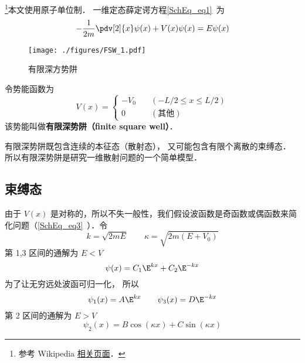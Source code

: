 
\begin{issues}
\issueTODO
\end{issues}





\footnote{参考 Wikipedia \href{https://en.wikipedia.org/wiki/Finite_potential_well}{相关页面}．}本文使用原子单位制． 一维定态薛定谔方程\autoref{SchEq_eq1}~为
\begin{equation}
-\frac{1}{2m}\pdv[2]{x}\psi(x) + V(x) \psi(x) = E \psi(x)
\end{equation}

\begin{figure}[ht]
\centering
\texttt{[image: ./figures/FSW\_1.pdf]}
\caption{有限深方势阱} \label{FSW_fig1}
\end{figure}
令势能函数为
\begin{equation}
V(x) = \begin{cases}
-V_0 \quad &(-L/2 \leqslant x \leqslant L/2)\\
0 \quad &(\text{其他})
\end{cases}
\end{equation}
该势能叫做\textbf{有限深势阱（finite square well）}．

有限深势阱既包含连续的本征态（散射态）， 又可能包含有限个离散的束缚态． %
所以有限深势阱是研究一维散射问题的一个简单模型．

\subsection{束缚态}
由于 $V(x)$ 是对称的，所以不失一般性，我们假设波函数是奇函数或偶函数来简化问题（\autoref{SchEq_eq3}~）．令
\begin{equation}\label{FSW_eq4}
k = \sqrt{2mE} \qquad \kappa = \sqrt{2m(E + V_0)}
\end{equation}
第 1,3 区间的通解为 $E < V$
\begin{equation}
\psi(x) = C_1 \E^{kx} + C_2 \E^{-kx}
\end{equation}
为了让无穷远处波函可归一化， 所以
\begin{equation}
\psi_1(x) = A \E^{kx} \qquad \psi_3(x) = D\E^{-kx}
\end{equation}
第 2 区间的通解为 $E > V$
\begin{equation}
\psi_2(x) = B \cos(\kappa x) + C\sin(\kappa x)
\end{equation}

